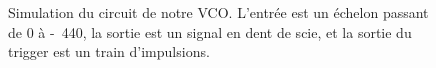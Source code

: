 \begin{figure}[ht]
	\centering
	\caption{Simulation du circuit de notre VCO. L'entrée est un échelon
	passant de \unit{0}{\volt} à \unit{-440}{\milli\volt}, la sortie
	est un signal en dent de scie, et la sortie du trigger est un train
	d'impulsions.}
	\label{fig:simulation}
\end{figure}

